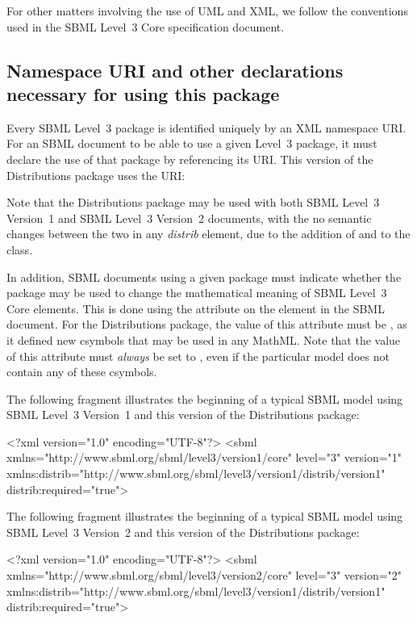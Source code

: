 \documentclass[draftspec]{sbmlpkgspec}
\newcommand{\sbmlthreecore}{SBML Level~3 Core\xspace}
\newcommand{\threeone}{SBML Level~3 Version~1\xspace}
\newcommand{\threetwo}{SBML Level~3 Version~2\xspace}
\newcommand{\DistribBase}{\defRef{DistribBase}{DistribBase-class}}
\newcommand{\distribshort}{\emph{distrib}\xspace}
\newcommand{\distrib}{Distributions\xspace}
\begin{document}
For other matters involving the use of UML and XML, we follow the
conventions used in the SBML Level~3 Core specification document.  


\subsection{Namespace URI and other declarations necessary for using this package}
\label{xml-namespace}

Every SBML Level~3 package is identified uniquely by an XML namespace URI.  For an SBML document to be able to use a given Level~3 package, it must declare the use of that package by referencing its URI.  This version of the \distrib package uses the URI:
\begin{center}
\end{center}

Note that the \distrib package may be used with both \threeone and \threetwo documents, with the no semantic changes between the two in any \distribshort element, due to the addition of  and  to the \DistribBase class.

In addition, SBML documents using a given package must indicate whether the package may be used to change the mathematical meaning of \sbmlthreecore elements.  This is done using the attribute  on the  element in the SBML document.  For the \distrib package, the value of this attribute must be , as it defined new csymbols that may be used in any MathML.  Note that the value of this attribute must \emph{always} be set to , even if the particular model does not contain any of these csymbols.

The following fragment illustrates the beginning of a typical SBML model using \threeone and this version of the \distrib package:

\begin{example}
<?xml version="1.0" encoding="UTF-8"?>
<sbml xmlns="http://www.sbml.org/sbml/level3/version1/core" level="3" version="1"
      xmlns:distrib="http://www.sbml.org/sbml/level3/version1/distrib/version1"
      distrib:required="true">
\end{example}


The following fragment illustrates the beginning of a typical SBML model using \threetwo and this version of the \distrib package:

\begin{example}
<?xml version="1.0" encoding="UTF-8"?>
<sbml xmlns="http://www.sbml.org/sbml/level3/version2/core" level="3" version="2"
      xmlns:distrib="http://www.sbml.org/sbml/level3/version1/distrib/version1"
      distrib:required="true">
\end{example}
\end{document}
